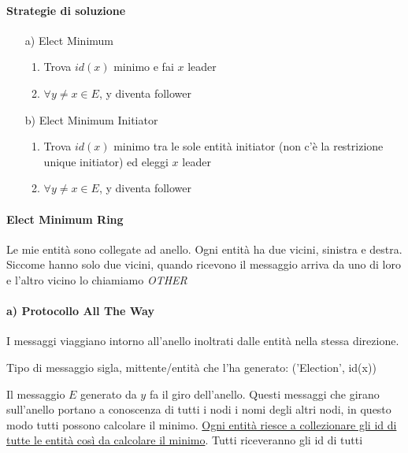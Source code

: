 \paragraph{Strategie di soluzione}
\begin{itemize}
    \item [a)] Elect Minimum
    \begin{enumerate}
        \item Trova $id(x)$ minimo e fai $x$ leader
        \item $\forall y \neq x \in E$, y diventa follower
    \end{enumerate}
    \item [b)] Elect Minimum Initiator
    \begin{enumerate}
        \item Trova $id(x)$ minimo tra le sole entità initiator (non c'è la restrizione unique initiator) ed eleggi $x$ leader
        \item $\forall y \neq x \in E$, y diventa follower
    \end{enumerate}
\end{itemize}

\paragraph{Elect Minimum Ring}
Le mie entità sono collegate ad anello. Ogni entità ha due vicini, sinistra e destra. Siccome hanno solo due vicini, quando ricevono il messaggio arriva da uno di loro e l'altro vicino lo chiamiamo \textit{OTHER}

\paragraph{a) Protocollo All The Way}
I messaggi viaggiano intorno all'anello inoltrati dalle entità nella stessa direzione.

Tipo di messaggio sigla, mittente/entità che l'ha generato: ('Election', id(x))

Il messaggio $E$ generato da $y$ fa il giro dell'anello. Questi messaggi che girano sull'anello portano a conoscenza di tutti i nodi i nomi degli altri nodi, in questo modo tutti possono calcolare il minimo. \uline{Ogni entità riesce a collezionare gli id di tutte le entità così da calcolare il minimo}. Tutti riceveranno gli id di tutti

